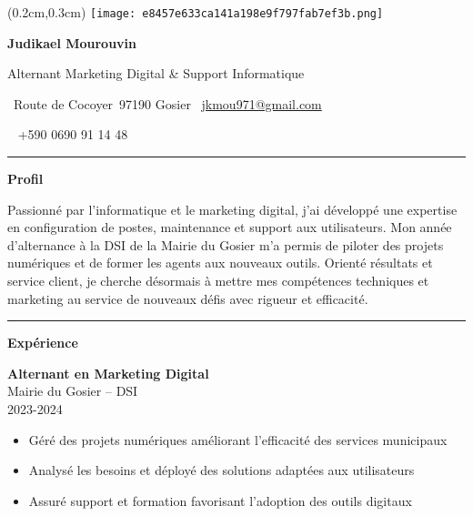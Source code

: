 \documentclass[a4paper]{article}
\renewcommand{\colorbox}[2]{#2}%
\newcommand{\fullrule}{\hspace{-1.5cm}\rule{\paperwidth}{0.4pt}}
\newcommand{\cvsection}[1]{%
  \vspace{6pt}\textbf{\Large #1}\par\vspace{2pt}}
\begin{document}
\color{white}
\begin{textblock*}{4cm}(0.2cm,0.3cm)
  \texttt{[image: e8457e633ca141a198e9f797fab7ef3b.png]}
\end{textblock*}

\begin{center}
  {\fontsize{44pt}{24pt}\selectfont\bfseries Judikael Mourouvin}

  \bigskip
  {\Large Alternant Marketing Digital \& Support Informatique}

  \bigskip\bigskip
  \faMapMarker~Route de Cocoyer\ 97190 Gosier
  \quad\faEnvelope~\href{mailto:jkmou971@gmail.com}{jkmou971@gmail.com}

  \bigskip
  \faPhone~ +590 0690 91 14 48
  \quad \faLinkedin\ \href{}{}
 

  \vspace{-0.3cm}
  \fullrule
\end{center}

\cvsection{Profil}
Passionné par l’informatique et le marketing digital, j’ai développé une expertise en configuration de postes, maintenance et support aux utilisateurs. Mon année d’alternance à la DSI de la Mairie du Gosier m’a permis de piloter des projets numériques et de former les agents aux nouveaux outils. Orienté résultats et service client, je cherche désormais à mettre mes compétences techniques et marketing au service de nouveaux défis avec rigueur et efficacité.

\medskip\fullrule

\cvsection{Expérience}
\hspace*{1.3cm}%

\colorbox{maincolor}{%
  \begin{minipage}{\linewidth}
    \textbf{Alternant en Marketing Digital} \\ Mairie du Gosier – DSI \\ 2023-2024
    \begin{itemize}
      \item Géré des projets numériques améliorant l’efficacité des services municipaux \item Analysé les besoins et déployé des solutions adaptées aux utilisateurs \item Assuré support et formation favorisant l’adoption des outils digitaux
    \end{itemize}
  \end{minipage}}
\end{document}
